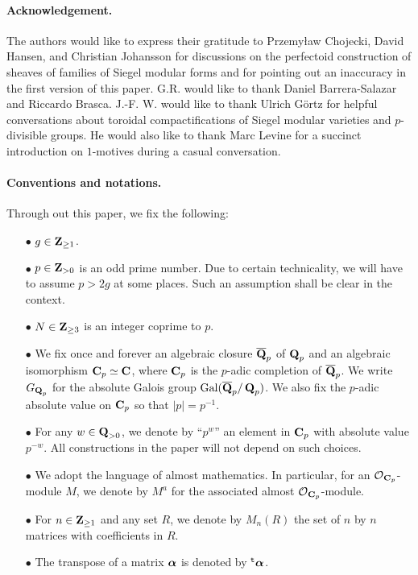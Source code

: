\paragraph{Acknowledgement.} The authors would like to express their gratitude to Przemy{\l}aw Chojecki, David Hansen, and Christian Johansson for discussions on the perfectoid construction of sheaves of families of Siegel modular forms and for pointing out an inaccuracy in the first version of this paper. G.R. would like to thank Daniel Barrera-Salazar and Riccardo Brasca. J.-F. W. would like to thank Ulrich G\"ortz for helpful conversations about toroidal compactifications of Siegel modular varieties and $p$-divisible groups. He would also like to thank Marc Levine for a succinct introduction on $1$-motives during a casual conversation. 


\paragraph{Conventions and notations.} Through out this paper, we fix the following: \begin{enumerate}
    \item[$\bullet$] $g\in \operatorname{\mathbf{Z}}_{\geq 1}$.
    \item[$\bullet$] $p\in \operatorname{\mathbf{Z}}_{> 0}$ is an odd prime number. Due to certain technicality, we will have to assume $p>2g$ at some places. Such an assumption shall be clear in the context. 
    \item[$\bullet$] $N\in \operatorname{\mathbf{Z}}_{\geq 3}$ is an integer coprime to $p$.
    \item[$\bullet$] We fix once and forever an algebraic closure $\overline{\operatorname{\mathbf{Q}}}_p$ of $\operatorname{\mathbf{Q}}_p$ and an algebraic isomorphism $\operatorname{\mathbf{C}}_p\simeq \operatorname{\mathbf{C}}$, where $\operatorname{\mathbf{C}}_p$ is the $p$-adic completion of $\overline{\operatorname{\mathbf{Q}}}_p$. We write $G_{\operatorname{\mathbf{Q}}_p}$ for the absolute Galois group $\operatorname{Gal}(\overline{\operatorname{\mathbf{Q}}}_p/\operatorname{\mathbf{Q}}_p)$. We also fix the $p$-adic absolute value on $\operatorname{\mathbf{C}}_p$ so that $|p|=p^{-1}$.
    \item[$\bullet$] For any $w\in \operatorname{\mathbf{Q}}_{>0}$, we denote by ``$p^w$'' an element in $\operatorname{\mathbf{C}}_p$ with absolute value $p^{-w}$. All constructions in the paper will not depend on such choices.
    \item[$\bullet$] We adopt the language of almost mathematics. In particular, for an $\operatorname{\mathcal{O}}_{\operatorname{\mathbf{C}}_p}$-module $M$, we denote by $M^a$ for the associated almost $\operatorname{\mathcal{O}}_{\operatorname{\mathbf{C}}_p}$-module.
    \item[$\bullet$] For $n\in \operatorname{\mathbf{Z}}_{\geq 1}$ and any set $R$, we denote by $M_n(R)$ the set of $n$ by $n$ matrices with coefficients in $R$.
    \item[$\bullet$] The transpose of a matrix $\operatorname{\boldsymbol{\alpha}}$ is denoted by $\operatorname{^{\mathtt{t}}\!}\operatorname{\boldsymbol{\alpha}}$.

\end{enumerate}
